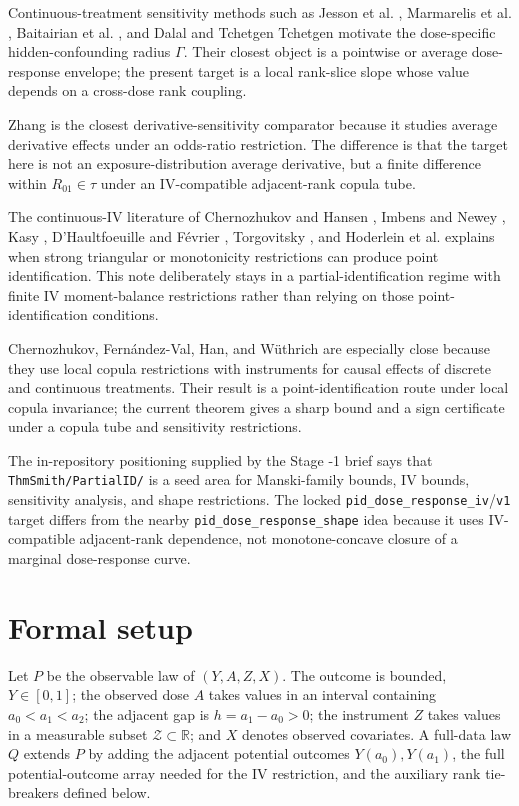 \documentclass[11pt]{article}
\theoremstyle{definition}
\theoremstyle{plain}
\theoremstyle{remark}
\begin{document}
Continuous-treatment sensitivity methods such as Jesson et al. \cite{JessonDouglasManshausenSolalMeinshausenStierGalShalit2022}, Marmarelis et al. \cite{MarmarelisHaddadJessonJahanshadGalstyanVerSteeg2023}, Baitairian et al. \cite{BaitairianSebastienJreichKatsahianGuilloux2025}, and Dalal and Tchetgen Tchetgen \cite{DalalTchetgenTchetgen2025} motivate the dose-specific hidden-confounding radius \(\Gamma\).  Their closest object is a pointwise or average dose-response envelope; the present target is a local rank-slice slope whose value depends on a cross-dose rank coupling.

Zhang \cite{Zhang2025ADE} is the closest derivative-sensitivity comparator because it studies average derivative effects under an odds-ratio restriction.  The difference is that the target here is not an exposure-distribution average derivative, but a finite difference within \(R_{01}\in\tau\) under an IV-compatible adjacent-rank copula tube.

The continuous-IV literature of Chernozhukov and Hansen \cite{ChernozhukovHansen2005}, Imbens and Newey \cite{ImbensNewey2009}, Kasy \cite{Kasy2014}, D'Haultfoeuille and F\'evrier \cite{DHaultfoeuilleFevrier2015}, Torgovitsky \cite{Torgovitsky2015}, and Hoderlein et al. \cite{HoderleinHolzmannKasyMeister2017} explains when strong triangular or monotonicity restrictions can produce point identification.  This note deliberately stays in a partial-identification regime with finite IV moment-balance restrictions rather than relying on those point-identification conditions.

Chernozhukov, Fern\'andez-Val, Han, and W\"uthrich \cite{ChernozhukovFernandezValHanWuthrich2024} are especially close because they use local copula restrictions with instruments for causal effects of discrete and continuous treatments.  Their result is a point-identification route under local copula invariance; the current theorem gives a sharp bound and a sign certificate under a copula tube and sensitivity restrictions.

The in-repository positioning supplied by the Stage -1 brief says that \texttt{ThmSmith/PartialID/} is a seed area for Manski-family bounds, IV bounds, sensitivity analysis, and shape restrictions.  The locked \texttt{pid\_dose\_response\_iv}/\texttt{v1} target differs from the nearby \texttt{pid\_dose\_response\_shape} idea because it uses IV-compatible adjacent-rank dependence, not monotone-concave closure of a marginal dose-response curve.

\section{Formal setup}
Let \(P\) be the observable law of \((Y,A,Z,X)\).  The outcome is bounded, \(Y\in[0,1]\); the observed dose \(A\) takes values in an interval containing \(a_0<a_1<a_2\); the adjacent gap is \(h=a_1-a_0>0\); the instrument \(Z\) takes values in a measurable subset \(\mathcal Z\subset\mathbb R\); and \(X\) denotes observed covariates.  A full-data law \(Q\) extends \(P\) by adding the adjacent potential outcomes \(Y(a_0),Y(a_1)\), the full potential-outcome array needed for the IV restriction, and the auxiliary rank tie-breakers defined below.
\end{document}
